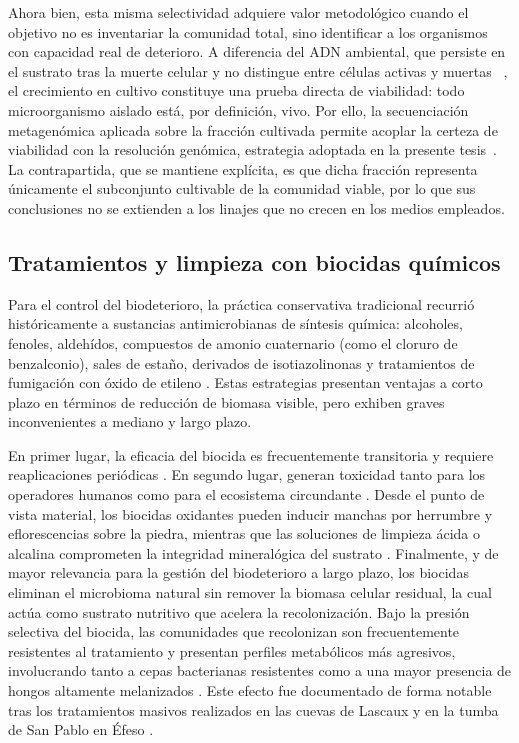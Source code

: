 Ahora bien, esta misma selectividad adquiere valor metodológico cuando el objetivo no es
inventariar la comunidad total, sino identificar a los organismos con capacidad real de
deterioro. A diferencia del ADN ambiental, que persiste en el sustrato tras la muerte
celular y no distingue entre células activas y muertas ~\cite{branysova2022}, el crecimiento
en cultivo constituye una prueba directa de viabilidad: todo microorganismo aislado está,
por definición, vivo. Por ello, la secuenciación metagenómica aplicada sobre la fracción
cultivada permite acoplar la certeza de viabilidad con la resolución genómica, estrategia
adoptada en la presente tesis~\cite{tsukayama2025informe}. La contrapartida, que se
mantiene explícita, es que dicha fracción representa únicamente el subconjunto cultivable
de la comunidad viable, por lo que sus conclusiones no se extienden a los linajes que no
crecen en los medios empleados.

\subsection{Tratamientos y limpieza con biocidas químicos}
\label{subsec:biocidas_quimicos}

Para el control del biodeterioro, la práctica conservativa tradicional recurrió históricamente a sustancias antimicrobianas de síntesis química: alcoholes, fenoles, aldehídos, compuestos de amonio cuaternario (como el cloruro de benzalconio), sales de estaño, derivados de isotiazolinonas y tratamientos de fumigación con óxido de etileno \cite{sterflinger2013, cappitelli2020}. Estas estrategias presentan ventajas a corto plazo en términos de reducción de biomasa visible, pero exhiben graves inconvenientes a mediano y largo plazo.

En primer lugar, la eficacia del biocida es frecuentemente transitoria y requiere reaplicaciones periódicas \cite{cappitelli2020}. En segundo lugar, generan toxicidad tanto para los operadores humanos como para el ecosistema circundante \cite{cappitelli2020}. Desde el punto de vista material, los biocidas oxidantes pueden inducir manchas por herrumbre y eflorescencias sobre la piedra, mientras que las soluciones de limpieza ácida o alcalina comprometen la integridad mineralógica del sustrato \cite{cappitelli2020}. Finalmente, y de mayor relevancia para la gestión del biodeterioro a largo plazo, los biocidas eliminan el microbioma natural sin remover la biomasa celular residual, la cual actúa como sustrato nutritivo que acelera la recolonización. Bajo la presión selectiva del biocida, las comunidades que recolonizan son frecuentemente resistentes al tratamiento y presentan perfiles metabólicos más agresivos, involucrando tanto a cepas bacterianas resistentes como a una mayor presencia de hongos altamente melanizados \cite{cappitelli2020, gorbushina2007}. Este efecto fue documentado de forma notable tras los tratamientos masivos realizados en las cuevas de Lascaux y en la tumba de San Pablo en Éfeso \cite{sterflinger2013}.

